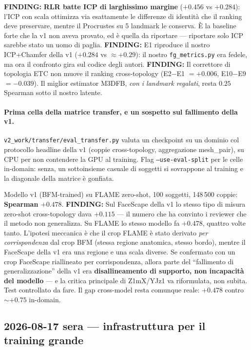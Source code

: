 \documentclass[11pt,a4paper]{article}
\newcommand{\finding}[1]{\textcolor{finding}{\textbf{FINDING:}} #1}
\begin{document}
\finding{\textbf{RLR batte ICP di larghissimo margine} ($+0.456$ vs $+0.284$): l'ICP con
scala ottimizza via esattamente le differenze di identit\`a che il ranking deve preservare,
mentre il Procrustes su 5 landmark le conserva. \`E la baseline forte che la v1 non aveva
provato, ed \`e quella da riportare --- riportare solo ICP sarebbe stato un uomo di paglia.}
\finding{E1 riproduce il nostro ICP+Chamfer della v1 ($+0.284$ vs $\approx +0.29$): il
nostro \texttt{fg\_metrics.py} era fedele, ma ora il confronto gira sul codice degli autori.}
\finding{Il correttore di topologia ETC non muove il ranking cross-topology
(E2$-$E1 $= +0.006$, E10$-$E9 $= -0.039$). Il miglior estimator M3DFB, \emph{con i landmark
regalati}, resta $0.25$ Spearman sotto il nostro latente.}

\paragraph{Prima cella della matrice transfer, e un sospetto sul fallimento della v1.}
\texttt{v2\_work/transfer/eval\_transfer.py} valuta un checkpoint su un dominio col
protocollo headline della v1 (coppie cross-topology, aggregazione mesh\_pair), su CPU per
non contendere la GPU al training. Flag \texttt{--use-eval-split} per le celle in-domain:
senza, un sottoinsieme casuale di soggetti si sovrappone al training e la diagonale della
matrice \`e gonfiata.

Modello v1 (BFM-trained) su FLAME zero-shot, 100 soggetti, 148\,500 coppie:
\textbf{Spearman $+0.478$}.
\finding{Sul FaceScape della v1 lo stesso tipo di misura zero-shot cross-topology dava
$\mathbf{+0.115}$ --- il numero che ha convinto i reviewer che il metodo non generalizza.
Su FLAME lo stesso modello fa $+0.478$, quattro volte tanto. L'ipotesi meccanica \`e che il
crop FLAME \`e stato derivato \emph{per corrispondenza} dal crop BFM (stessa regione
anatomica, stesso bordo), mentre il FaceScape della v1 era una regione e una scala diverse.
Se confermato con un crop FaceScape riallineato per corrispondenza, allora parte del
``fallimento di generalizzazione'' della v1 era \textbf{disallineamento di supporto, non
incapacit\`a del modello} --- e la critica principale di Z1mX/YJz1 va riformulata, non
subita. Test controllato da fare.}
Il gap cross-model resta comunque reale: $+0.478$ contro $\sim+0.75$ in-domain.

\subsection{2026-08-17 sera --- infrastruttura per il training grande}
\end{document}
